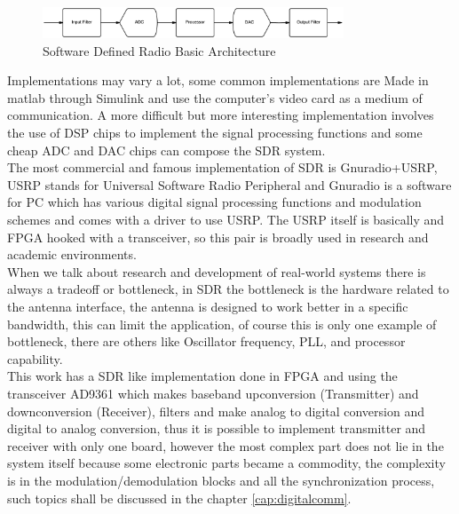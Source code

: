  \begin{figure}[htbp]
     \centering
     \includegraphics[width=0.8\textwidth]{./figures/sdr_basic_arch}
     \caption{ Software Defined Radio Basic Architecture
     \label{fig:sdr_basic}}
 \end{figure}


Implementations may vary a lot, some common implementations are Made in matlab
through Simulink and use the computer’s video card as a medium of communication.
A more difficult but more interesting implementation involves the use of DSP chips
to implement the signal processing functions and some cheap ADC and DAC chips can
compose the SDR system.\\

The most commercial and famous implementation of SDR is Gnuradio+USRP, USRP
stands for Universal Software Radio Peripheral \cite{web:usrp} and Gnuradio \cite{web:gnuradio}
is a software for PC which has various digital signal processing functions and
modulation schemes and comes with a driver to use USRP. The USRP itself is
basically and FPGA hooked with a transceiver, so this pair is broadly used in
research and academic environments.\\

When we talk about research and development of real-world systems there is always
a tradeoff or bottleneck, in SDR the bottleneck is the hardware related to the
antenna interface, the antenna is designed to work better in a specific bandwidth,
this can limit the application, of course this is only one example of bottleneck,
there are others like Oscillator frequency, PLL, and processor capability.\\


This work has a SDR like implementation done in FPGA and using the transceiver
AD9361 which makes baseband upconversion (Transmitter) and downconversion (Receiver),
filters and make analog to digital conversion and digital to analog conversion,
thus it is possible to implement transmitter and receiver with only one board,
however the most complex part does not lie in the system itself because some electronic
parts became a commodity, the complexity is in the modulation/demodulation blocks
and all the synchronization process, such topics shall be discussed in the chapter \ref{cap:digitalcomm}.
